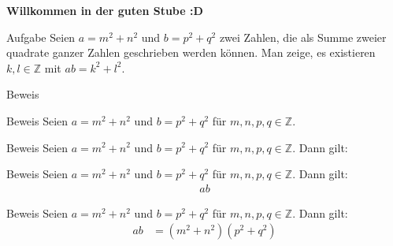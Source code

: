 \documentclass[10pt]{beamer}
\title{}
\author{Artur's Mathematikstübchen}
\date{}
\def\bZ{\mathbb{Z}}
\begin{document}

\begin{frame}
    \begin{center}
        \textbf{\huge Willkommen in der guten Stube \newline \newline :D}
    \end{center}
\end{frame}




\begin{frame}
    \begin{alertblock}{Aufgabe}
        Seien \( a = m^{2} + n^{2} \) und \( b = p^{2} + q^{2} \) zwei Zahlen, die als Summe zweier quadrate ganzer Zahlen geschrieben werden können. Man zeige, es existieren \( k, l \in \bZ \) mit \( ab = k^{2} + l^{2}  \).
    \end{alertblock}
\end{frame}



\begin{frame}{Beweis}
    
\end{frame}



\begin{frame}{Beweis}
    Seien \( a = m^{2} + n^{2} \) und \( b = p^{2} + q^{2} \) für \( m, n, p, q \in \bZ \).
\end{frame}



\begin{frame}{Beweis}
    Seien \( a = m^{2} + n^{2} \) und \( b = p^{2} + q^{2} \) für \( m, n, p, q \in \bZ \). Dann gilt:
\end{frame}



\begin{frame}{Beweis}
    Seien \( a = m^{2} + n^{2} \) und \( b = p^{2} + q^{2} \) für \( m, n, p, q \in \bZ \). Dann gilt:
    \begin{align*}
        ab
    \end{align*}
\end{frame}



\begin{frame}{Beweis}
    Seien \( a = m^{2} + n^{2} \) und \( b = p^{2} + q^{2} \) für \( m, n, p, q \in \bZ \). Dann gilt:
    \begin{align*}
        ab
        & = \left( m^{2} + n^{2} \right) \left( p^{2} + q^{2} \right)
    \end{align*}
\end{frame}
\end{document}
